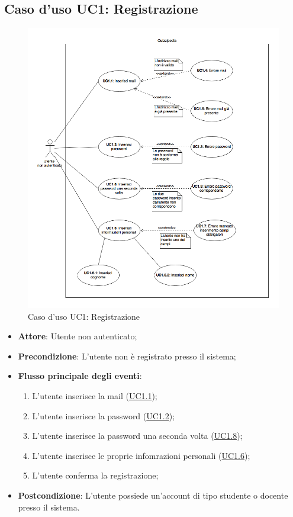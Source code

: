 \documentclass[12pt,a4paper]{article}
\begin{document}
\hypertarget{UC1}{}
\subsection{Caso d'uso UC1: Registrazione}
\begin{figure}[H]
	\centering
	\includegraphics[width=\textwidth]{diagramUC1.png}
	\caption{Caso d'uso UC1: Registrazione}\label{fig:UC1} 
\end{figure}
\begin{itemize}

\item \textbf{Attore}: Utente non autenticato;
\item \textbf{Precondizione}: L’utente non è registrato presso il sistema;

\item \textbf{Flusso principale degli eventi}:
\begin{enumerate}
	\item L'utente inserisce la mail (\hyperlink{UC1.1}{UC1.1});
	\item L'utente inserisce la password (\hyperlink{UC1.2}{UC1.2});
	\item L'utente inserisce la password una seconda volta (\hyperlink{UC1.8}{UC1.8});
	\item L'utente inserisce le proprie infomrazioni personali (\hyperlink{UC1.6}{UC1.6});
	\item L'utente conferma la registrazione;
	
\end{enumerate}
\item \textbf{Postcondizione}: L’utente possiede un’account di tipo studente o docente presso il sistema.
\end{itemize}
\hypertarget{UC1.1}{}
\end{document}
